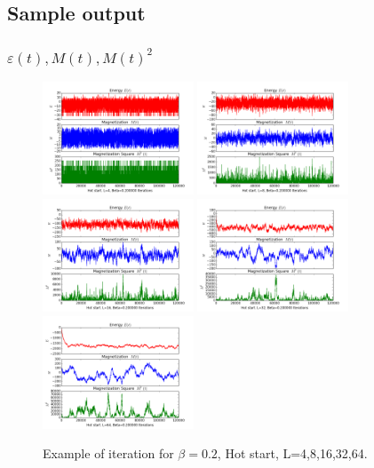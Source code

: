 \documentclass[12pt]{article}
\begin{document}
\subsection{Sample output}

\subsubsection{$\varepsilon(t),M(t),M(t)^2$}
\begin{figure}[h!]
	\begin{center}
		\includegraphics[width=0.4\textwidth]{exp1/Hot_L_4_Beta_2_iter_120000.png}
		\includegraphics[width=0.4\textwidth]{exp1/Hot_L_8_Beta_2_iter_120000.png}
		\includegraphics[width=0.4\textwidth]{exp1/Hot_L_16_Beta_2_iter_120000.png}
		\includegraphics[width=0.4\textwidth]{exp1/Hot_L_32_Beta_2_iter_120000.png}
		\includegraphics[width=0.4\textwidth]{exp1/Hot_L_64_Beta_2_iter_120000.png}
		\caption{Example of iteration for $\beta = 0.2$, Hot start, L=4,8,16,32,64.}
		\label{fig1}
	\end{center}
\end{figure}
\end{document}
